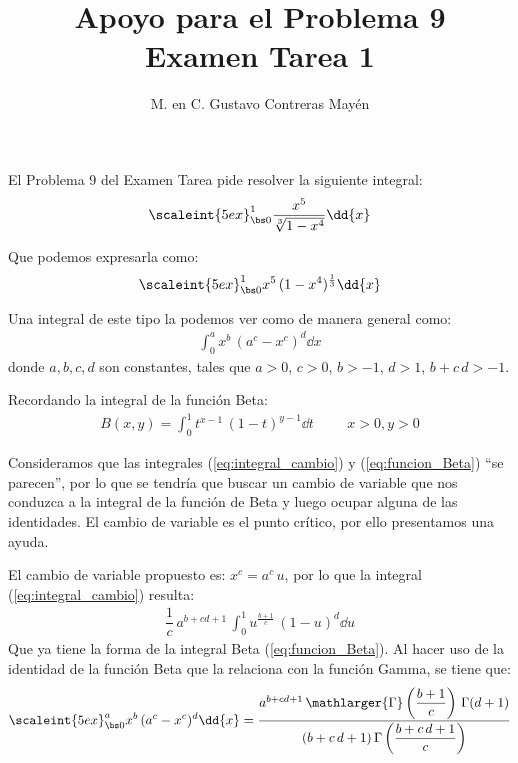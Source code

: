
\usepackage{titling}
\setlength{\droptitle}{-3cm}
\title{Apoyo para el Problema 9 \\[0.3em]  \large{Examen Tarea 1} \vspace{-3ex}}
\author{M. en C. Gustavo Contreras Mayén}
\date{ }


\vspace{-4cm}
\maketitle
\fontsize{14}{14}\selectfont

El Problema 9 del Examen Tarea pide resolver la siguiente integral:
\begin{align*}
\scaleint{5ex}_{\bs 0}^{1} \dfrac{x^{5}}{\sqrt[3]{1 - x^{4}}} \dd{x}
\end{align*}

Que podemos expresarla como:
\begin{align*}
\scaleint{5ex}_{\bs 0}^{1} x^{5} \, (1 - x^{4})^{\frac{1}{3}} \dd{x}
\end{align*}

Una integral de este tipo la podemos ver como de manera general como:
\begin{align}
\int_{0}^{a} x^{b} \, (a^{c} - x^{c})^{d} \dd{x}
\label{eq:integral_cambio}
\end{align}
donde $a, b, c, d$ son constantes, tales que $a > 0$, $c > 0$, $b > -1$, $d > 1$, $b + c \, d > -1$. 

Recordando la integral de la función Beta:
\begin{align}
B(x, y) = \int_{0}^{1} t^{x-1} \, (1 -t)^{y-1} \dd{t} \hspace{1cm} x > 0, y > 0
\label{eq:funcion_Beta}
\end{align}

Consideramos que las integrales (\ref{eq:integral_cambio}) y (\ref{eq:funcion_Beta}) \enquote{se parecen}, por lo que se tendría que buscar un cambio de variable que nos conduzca a la integral de la función de Beta y luego ocupar alguna de las identidades. El cambio de variable es el punto crítico, por ello presentamos una ayuda. 
\par
El cambio de variable propuesto es: $x^{c} = a^{c} \, u$, por lo que la integral (\ref{eq:integral_cambio}) resulta:
\begin{align*}
\dfrac{1}{c} \, a^{b+cd+1} \,\int_{0}^{1} u^{\frac{b+1}{c}} \, (1 - u)^{d} \dd{u}
\end{align*}
Que ya tiene la forma de la integral Beta (\ref{eq:funcion_Beta}). Al hacer uso de la identidad de la función Beta que la relaciona con la función Gamma, se tiene que:
\begin{align}
\scaleint{5ex}_{\bs 0}^{a} x^{b} \, (a^{c} - x^{c})^{d} \dd{x} = \dfrac{a^{b+cd+1} \, \mathlarger{\Gamma} \left( \dfrac{b + 1}{c} \right) \, \Gamma (d + 1)}{(b + c \, d + 1) \, \Gamma \left( \dfrac{b + c \, d + 1}{c} \right)}
\label{eq:identidad_Gamma}
\end{align}

